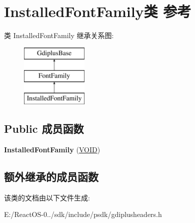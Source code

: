 \hypertarget{class_installed_font_family}{}\section{Installed\+Font\+Family类 参考}
\label{class_installed_font_family}
类 Installed\+Font\+Family 继承关系图\+:\begin{figure}[H]
\begin{center}
\leavevmode
\includegraphics[height=3.000000cm]{class_installed_font_family}
\end{center}
\end{figure}
\subsection*{Public 成员函数}
\begin{DoxyCompactItemize}
\item 
\mbox{\label{class_installed_font_family_a060a64d8f432e0eb3fdbd33e3f8c2e19}} 
{\bfseries Installed\+Font\+Family} (\hyperlink{interfacevoid}{V\+O\+ID})
\end{DoxyCompactItemize}
\subsection*{额外继承的成员函数}


该类的文档由以下文件生成\+:\begin{DoxyCompactItemize}
\item 
E\+:/\+React\+O\+S-\/0../sdk/include/psdk/gdiplusheaders.\+h\end{DoxyCompactItemize}
